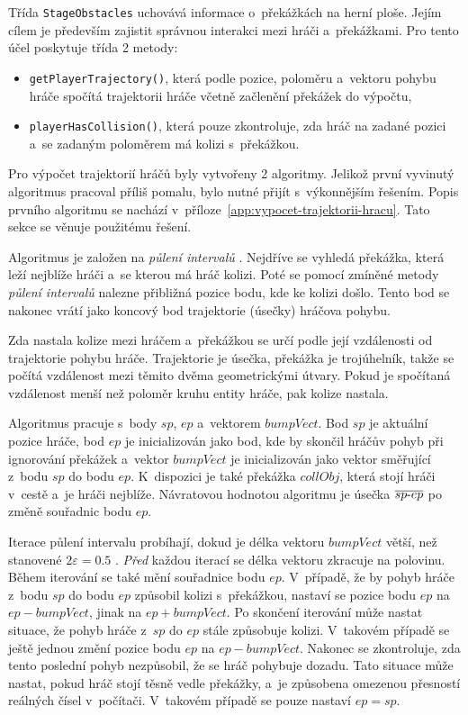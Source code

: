 Třída \texttt{StageObstacles} uchovává informace o~překážkách na herní ploše. Jejím cílem je především zajistit správnou interakci mezi hráči a~překážkami. Pro tento účel poskytuje třída 2 metody:
\begin{itemize}
    \item \texttt{getPlayerTrajectory()}, která podle pozice, poloměru a~vektoru pohybu hráče spočítá trajektorii hráče včetně začlenění překážek do výpočtu,
    \item \texttt{playerHasCollision()}, která pouze zkontroluje, zda hráč na zadané pozici a~se zadaným poloměrem má kolizi s~překážkou.
\end{itemize}

Pro výpočet trajektorií hráčů byly vytvořeny 2 algoritmy. Jelikož první vyvinutý algoritmus pracoval příliš pomalu, bylo nutné přijít s~výkonnějším řešením. Popis prvního algoritmu se nachází v~příloze~\ref{app:vypocet-trajektorii-hracu}. Tato sekce se věnuje použitému řešení.

Algoritmus je založen na \emph{půlení intervalů} \cite{INM_opora}. Nejdříve se vyhledá překážka, která leží nejblíže hráči a~se kterou má hráč kolizi. Poté se pomocí zmíněné metody \emph{půlení intervalů} nalezne přibližná pozice bodu, kde ke kolizi došlo. Tento bod se nakonec vrátí jako koncový bod trajektorie (úsečky) hráčova pohybu.

Zda nastala kolize mezi hráčem a~překážkou se určí podle její vzdálenosti od trajektorie pohybu hráče. Trajektorie je úsečka, překážka je trojúhelník, takže se počítá vzdálenost mezi těmito dvěma geometrickými útvary. Pokud je spočítaná vzdálenost menší než poloměr kruhu entity hráče, pak kolize nastala.

Algoritmus pracuje s~body $sp$, $ep$ a~vektorem $bumpVect$. Bod $sp$ je aktuální pozice hráče, bod $ep$ je inicializován jako bod, kde by skončil hráčův pohyb při ignorování překážek a~vektor $bumpVect$ je inicializován jako vektor směřující z~bodu $sp$ do bodu $ep$. K~dispozici je také překážka $collObj$, která stojí hráči v~cestě a~je hráči nejblíže. Návratovou hodnotou algoritmu je úsečka $\overline{sp{\text -}ep}$ po změně souřadnic bodu $ep$.

Iterace půlení intervalu probíhají, dokud je délka vektoru $bumpVect$ větší, než stanovené $2\varepsilon = 0.5$ \cite{INM_opora}. \emph{Před} každou iterací se délka vektoru zkracuje na polovinu. Během iterování se také mění souřadnice bodu $ep$. V~případě, že by pohyb hráče z~bodu $sp$ do bodu $ep$ způsobil kolizi s~překážkou, nastaví se pozice bodu $ep$ na $ep - bumpVect$, jinak na $ep + bumpVect$. Po skončení iterování může nastat situace, že pohyb hráče z~$sp$ do $ep$ stále způsobuje kolizi. V~takovém případě se ještě jednou změní pozice bodu $ep$ na $ep - bumpVect$. Nakonec se zkontroluje, zda tento poslední pohyb nezpůsobil, že se hráč pohybuje dozadu. Tato situace může nastat, pokud hráč stojí těsně vedle překážky, a~je způsobena omezenou přesností reálných čísel v~počítači. V~takovém případě se pouze nastaví $ep = sp$.

